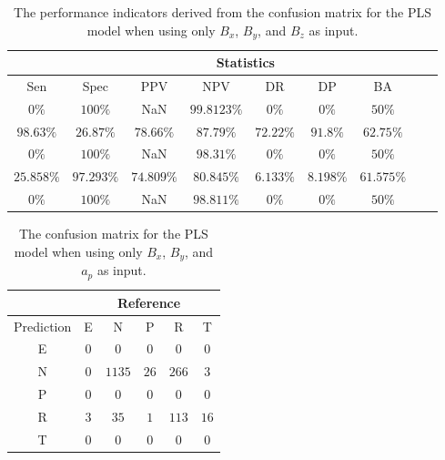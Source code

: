 \begin{table}[!ht]
	\centering
	\begin{tabular}{|c|c|c|c|c|c|c|c|c|}
		\hline
		 & \multicolumn{7}{c|}{Statistics} \\ \hline
		Sen & Spec & PPV & NPV & DR & DP & BA \\ \hline
		$0\%$ & $100\%$ & NaN & $99.8123\%$ & $0\%$ & $0\%$ & $50\%$ \\ \hline
		$98.63\%$ & $26.87\%$ & $78.66\%$ & $87.79\%$ & $72.22\%$ & $91.8\%$ & $62.75\%$ \\ \hline
		$0\%$ & $100\%$ & NaN & $98.31\%$ & $0\%$ & $0\%$ & $50\%$ \\ \hline
		$25.858\%$ & $97.293\%$ & $74.809\%$ & $80.845\%$ & $6.133\%$ & $8.198\%$ & $61.575\%$ \\ \hline
		$0\%$ & $100\%$ & NaN & $98.811\%$ & $0\%$ & $0\%$ & $50\%$ \\ \hline
	\end{tabular}
	\caption{The performance indicators derived from the confusion matrix for the PLS model when using only $B_{x}$, $B_{y}$, and $B_{z}$ as input.}
	\label{tab:cs:coord:pls}
\end{table}

\begin{table}[!ht]
	\centering
	\begin{tabular}{|c|c|c|c|c|c|}
		\hline
		 & \multicolumn{5}{|c|}{Reference} \\ \hline
		 Prediction & E & N & P & R & T \\ \hline
		 E & $0$ & $0$ & $0$ & $0$ & $0$ \\ \hline
		 N & $0$ & $1135$ & $26$ & $266$ & $3$ \\ \hline
		 P & $0$ & $0$ & $0$ & $0$ & $0$ \\ \hline
		 R & $3$ & $35$ & $1$ & $113$ & $16$ \\ \hline
		 T & $0$ & $0$ & $0$ & $0$ & $0$ \\ \hline
	\end{tabular}
	\caption{The confusion matrix for the PLS model when using only $B_{x}$, $B_{y}$, and $a_{p}$ as input.}
	\label{tab:cm:xyap:pls}
\end{table}

